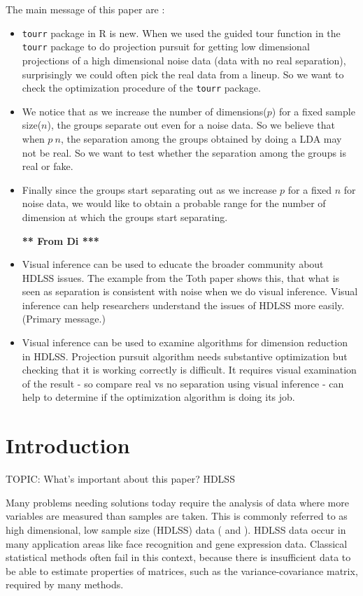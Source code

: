 \documentclass[12]{article}
\newcommand{\blue}{\color{blue}}
\begin{document}
{\color{red} The main message of this paper are :
\begin{itemize}
\item \texttt{tourr} package in R is new. When we used the guided tour function in the \texttt{tourr} package to do projection pursuit for getting low dimensional projections of a high dimensional noise data (data with no real separation), surprisingly we could often pick the real data from a lineup. So we want to check the optimization procedure of the \texttt{tourr} package.
\item  We notice that as we increase the number of dimensions($p$) for a fixed sample size($n$), the groups separate out even for a noise data. So we believe that when $p ~ n$, the separation among the groups obtained by doing a LDA may not be real. So we want to test whether the separation among the groups is real or fake.
\item Finally  since the groups start separating out as we increase $p$ for a fixed $n$ for noise data, we would like to obtain a probable range for the number of dimension at which the groups start separating. 
\bigskip

\centerline{\bf *** From Di ***}

\item Visual inference can be used to educate the broader community about HDLSS issues. The example from the Toth paper shows this, that what is seen as separation is consistent with noise when we do visual inference. Visual inference can help researchers understand the issues of HDLSS more easily. (Primary message.)
\item Visual inference can be used to examine algorithms for dimension reduction in HDLSS. Projection pursuit algorithm needs substantive optimization but checking that it is working correctly is difficult. It requires visual examination of the result - so compare real vs no separation using visual inference - can help to determine if the optimization algorithm is doing its job.
\end{itemize} }

\section{Introduction} 

{\blue TOPIC: What's important about this paper? HDLSS}

Many problems needing solutions today require the analysis of data where more variables are measured than samples are taken. This is commonly referred to as high dimensional, low sample size (HDLSS) data (\cite{hall:2005} and \cite{marron:2007}). %
HDLSS data occur in many application areas like face recognition and gene expression data. Classical statistical methods often fail in this context, because there is insufficient data to be able to estimate properties of matrices, such as the variance-covariance matrix, required by many methods. 
\end{document}
